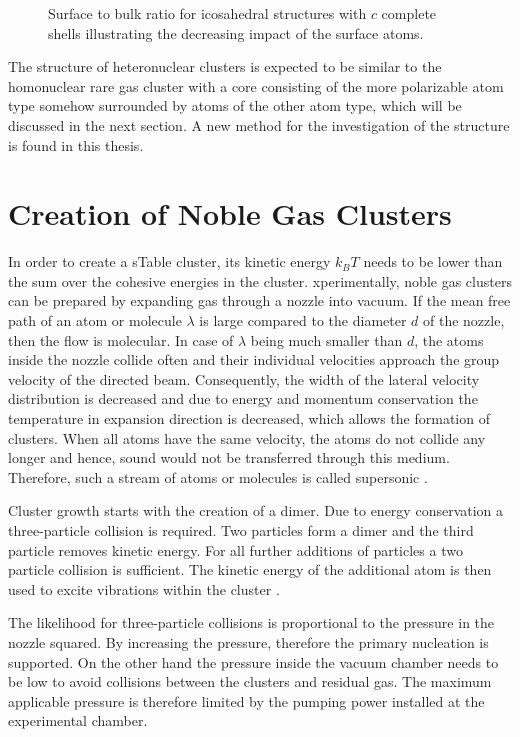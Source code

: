 \begin{figure}[h]
 \centering
 
 \caption{Surface to bulk ratio for icosahedral structures with $c$ complete
          shells illustrating the decreasing impact of the surface atoms.}
 \label{figure:surface_to_bulk}
\end{figure}

The structure of heteronuclear clusters is expected to be similar to the
homonuclear rare gas cluster with a core consisting of the more polarizable
atom type somehow surrounded by atoms of the other atom type, which will be discussed
in the next section. 
A new method for the investigation of the structure is found
in this thesis.


\section{Creation of Noble Gas Clusters}
In order to create a sTable cluster, its kinetic energy $k_BT$ needs to be lower
than the sum over the cohesive energies in the cluster.
xperimentally, noble gas clusters can be prepared by expanding gas
through a nozzle into vacuum.
If the mean free path of an atom or molecule
$\lambda$ is large compared to the diameter $d$ of the nozzle, then the flow is
molecular. In case of $\lambda$ being much smaller than $d$, the atoms inside
the nozzle collide often and their individual velocities approach the group
velocity of the directed beam.
Consequently, the width of the lateral velocity
distribution is decreased and due to energy and momentum conservation the temperature
in expansion direction is decreased, which allows the formation of clusters.
When all atoms have the same velocity, the atoms do not collide any longer
and hence, sound would not be transferred through this medium. Therefore,
such a stream of atoms or molecules is called supersonic \cite{Moore09}.

Cluster growth starts with the creation of a dimer. Due to energy conservation
a three-particle collision is required. Two particles form a dimer and the
third particle removes kinetic energy. For all further additions of particles
a two particle collision is sufficient. The kinetic energy of the additional
atom is then used to excite vibrations within the cluster \cite{Soler82}.

The likelihood for three-particle collisions is proportional to the pressure
in the nozzle squared. By increasing the pressure, therefore the 
primary nucleation is supported. On the other hand the 
pressure inside the vacuum chamber needs to be low to avoid collisions
between the clusters and residual gas. The maximum applicable pressure is
therefore limited by the pumping power installed at the experimental chamber.

